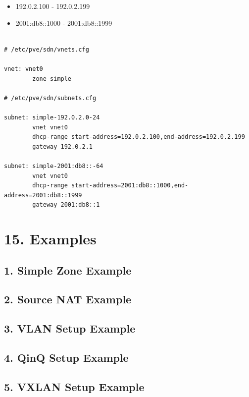 \begin{itemize}[leftmargin=2cm]

	\item 192.0.2.100 - 192.0.2.199

	\item 2001:db8::1000 - 2001:db8::1999

\end{itemize}

\begin{lstlisting}

# /etc/pve/sdn/vnets.cfg

vnet: vnet0
        zone simple

# /etc/pve/sdn/subnets.cfg

subnet: simple-192.0.2.0-24
        vnet vnet0
        dhcp-range start-address=192.0.2.100,end-address=192.0.2.199
        gateway 192.0.2.1

subnet: simple-2001:db8::-64
        vnet vnet0
        dhcp-range start-address=2001:db8::1000,end-address=2001:db8::1999
        gateway 2001:db8::1

\end{lstlisting}


\section{15. Examples}

\subsection{1. Simple Zone Example}

\subsection{2. Source NAT Example}

\subsection{3. VLAN Setup Example}

\subsection{4. QinQ Setup Example}

\subsection{5. VXLAN Setup Example}

